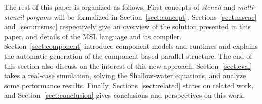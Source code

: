 The rest of this paper is organized as follows. First concepts of \emph{stencil} and \emph{multi-stencil porgams} will be formalized in Section~\ref{sect:concept}. Sections~\ref{sect:mscac} and~\ref{sect:msmsc} respectively give an overview of the solution presented in this paper, and details of the MSL language and its compiler. Section~\ref{sect:component} introduce component models and runtimes and explains the automatic generation of the component-based parallel structure. The end of this section also discuss on the interest of this new approach. Section~\ref{sect:eval} takes a real-case simulation, solving the Shallow-water equations, and analyze some performance results. Finally, Sections~\ref{sect:related} states on related work, and Section~\ref{sect:conclusion} gives conclusions and perspectives on this work.
